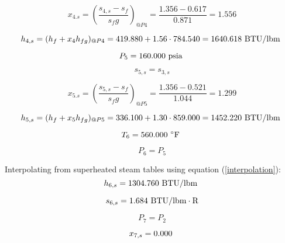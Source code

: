 \documentclass{article}
\begin{document}
\begin{equation}
x_{ 4.s} = (\frac{s_{ 4,s} - s_{f}}{s_fg})_{@P 4} = \frac{   1.356 -    0.617}{   0.871} =    1.556
\end{equation}

\begin{equation}
  h_{ 4,s} = (h_{f} + x_{ 4}h_{fg})_{@P 4} =  419.880 + 1.56\cdot 784.540 = 1640.618
\textnormal{ BTU/lbm                   }
\end{equation}

\begin{equation}
P_{ 5} =  160.000\textnormal{ psia                      }
\end{equation}

\begin{equation}
s_{ 5,s} = s_{ 3,s}
\end{equation}

\begin{equation}
x_{ 5.s} = (\frac{s_{ 5,s} - s_{f}}{s_fg})_{@P 5} = \frac{   1.356 -    0.521}{   1.044} =    1.299
\end{equation}

\begin{equation}
  h_{ 5,s} = (h_{f} + x_{ 5}h_{fg})_{@P 5} =  336.100 + 1.30\cdot 859.000 = 1452.220
\textnormal{ BTU/lbm                   }
\end{equation}

\begin{equation}
T_{ 6} =  560.000\textnormal{ \(^{\circ}\)F             }
\end{equation}

\begin{equation}
P_{ 6} = P_{ 5}
\end{equation}

Interpolating from superheated steam tables using equation (\ref{interpolation}):
\begin{equation}
  h_{ 6,s} = 1304.760\textnormal{ BTU/lbm                   }
\end{equation}

\begin{equation}
  s_{ 6,s} =    1.684\textnormal{ BTU/lbm}\cdot\textnormal{R}
\end{equation}

\begin{equation}
P_{ 7} = P_{ 2}
\end{equation}

\begin{equation}
  x_{ 7,s} =    0.000\textnormal{                           }
\end{equation}
\end{document}
